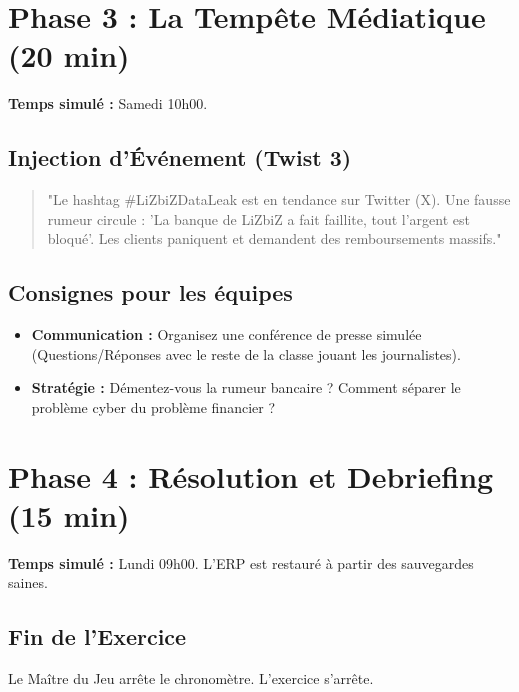 \section{Phase 3 : La Tempête Médiatique (20 min)}

\textbf{Temps simulé :} Samedi 10h00.

\subsection{Injection d'Événement (Twist 3)}
\begin{quote}
"Le hashtag \#LiZbiZDataLeak est en tendance sur Twitter (X). Une fausse rumeur circule : 'La banque de LiZbiZ a fait faillite, tout l'argent est bloqué'. Les clients paniquent et demandent des remboursements massifs."
\end{quote}

\subsection{Consignes pour les équipes}
\begin{itemize}
    \item \textbf{Communication :} Organisez une conférence de presse simulée (Questions/Réponses avec le reste de la classe jouant les journalistes).
    \item \textbf{Stratégie :} Démentez-vous la rumeur bancaire ? Comment séparer le problème cyber du problème financier ?
\end{itemize}

\section{Phase 4 : Résolution et Debriefing (15 min)}

\textbf{Temps simulé :} Lundi 09h00. L'ERP est restauré à partir des sauvegardes saines.

\subsection{Fin de l'Exercice}

Le Maître du Jeu arrête le chronomètre. L'exercice s'arrête.

